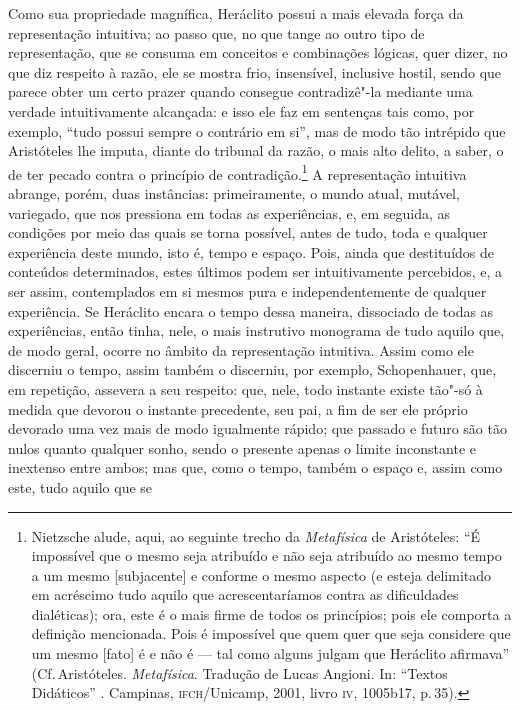 Como sua propriedade magnífica, Heráclito possui a mais elevada força da
representação intuitiva; ao passo que, no que tange ao outro tipo de
representação, que se consuma em conceitos e combinações lógicas, quer dizer,
no que diz respeito à razão, ele se mostra frio, insensível, inclusive
hostil, sendo que parece obter um certo prazer quando consegue contradizê"-la
mediante uma verdade intuitivamente alcançada: e isso ele faz em sentenças
tais como, por exemplo, ``tudo possui sempre o contrário em si'', mas de modo
tão intrépido que Aristóteles lhe imputa, diante do tribunal da razão, o mais
alto delito, a saber, o de ter pecado contra o princípio de contradição.\footnote{
Nietzsche alude, aqui, ao seguinte trecho da \textit{Metafísica} de Aristóteles: 
``É impossível que o mesmo seja atribuído e não seja atribuído ao mesmo tempo 
a um mesmo [subjacente] e conforme o mesmo aspecto (e esteja delimitado 
em acréscimo tudo aquilo que acrescentaríamos contra as dificuldades dialéticas); 
ora, este é o mais firme de todos os princípios; pois ele comporta a definição 
mencionada. Pois é impossível que quem quer que seja considere que um mesmo [fato] 
é e não é --- tal como alguns julgam que Heráclito afirmava'' (Cf.\,Aristóteles. 
\textit{Metafísica}. Tradução de Lucas Angioni. In: ``Textos Didáticos'' .
Campinas, \textsc{ifch}/Unicamp, 2001, livro \textsc{iv}, 1005b17, p.\,35).} A
representação intuitiva abrange, porém, duas instâncias: primeiramente, o
mundo atual, mutável, variegado, que nos pressiona em todas as experiências,
e, em seguida, as condições por meio das quais se torna possível, antes de
tudo, toda e qualquer experiência deste mundo, isto é, tempo e espaço. Pois,
ainda que destituídos de conteúdos determinados, estes últimos podem ser
intuitivamente percebidos, e, a ser assim, contemplados em si mesmos pura e
independentemente de qualquer experiência. Se Heráclito encara o tempo dessa
maneira, dissociado de todas as experiências, então tinha, nele, o mais
instrutivo monograma de tudo aquilo que, de modo geral, ocorre no âmbito da
representação intuitiva. Assim como ele discerniu o tempo, assim também o
discerniu, por exemplo, Schopenhauer, que, em repetição, assevera a seu
respeito: que, nele, todo instante existe tão"-só à medida que devorou o
instante precedente, seu pai, a fim de ser ele próprio devorado uma vez mais
de modo igualmente rápido; que passado e futuro são tão nulos quanto qualquer
sonho, sendo o presente apenas o limite inconstante e inextenso entre ambos;
mas que, como o tempo, também o espaço e, assim como este, tudo aquilo que se
